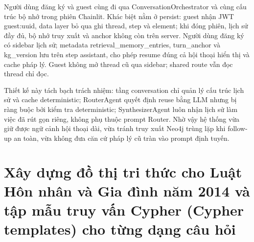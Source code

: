 \documentclass[../DoAn.tex]{subfiles}
\begin{document}
Người dùng đăng ký và guest cùng đi qua ConversationOrchestrator và cùng cấu trúc bộ nhớ trong phiên Chainlit. Khác biệt nằm ở persist: guest nhận JWT guest:uuid, data layer bỏ qua ghi thread, step và element; khi đóng phiên, lịch sử đầy đủ, bộ nhớ truy xuất và anchor không còn trên server. Người dùng đăng ký có sidebar lịch sử; metadata retrieval\_\allowbreak memory\_\allowbreak entries, turn\_\allowbreak anchor và kg\_\allowbreak version lưu trên step assistant, cho phép resume đúng cả hội thoại hiển thị và cache pháp lý. Guest không mở thread cũ qua sidebar; shared route vẫn đọc thread chỉ đọc.

Thiết kế này tách bạch trách nhiệm: tầng conversation chỉ quản lý cấu trúc lịch sử và cache deterministic; RouterAgent quyết định reuse bằng LLM nhưng bị ràng buộc bởi kiểm tra deterministic; SynthesizerAgent luôn nhận lịch sử làm việc đã rút gọn riêng, không phụ thuộc prompt Router. Nhờ vậy hệ thống vừa giữ được ngữ cảnh hội thoại dài, vừa tránh truy xuất Neo4j trùng lặp khi follow-up an toàn, vừa không đưa căn cứ pháp lý cũ tràn vào prompt định tuyến.

\section{Xây dựng đồ thị tri thức cho Luật Hôn nhân và Gia đình năm 2014 và tập mẫu truy vấn Cypher (Cypher templates) cho từng dạng câu hỏi}
\label{section:5.2}


\end{document}
